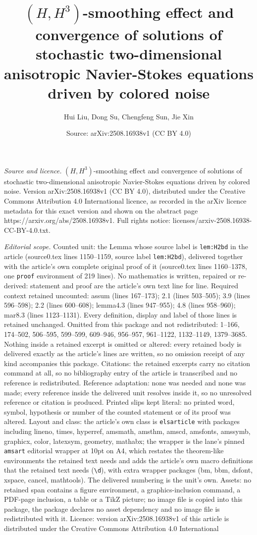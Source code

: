 \documentclass[10pt,a4paper]{amsart}
\title[$(H,H^3)$-smoothing effect and convergence of solutions of s]{$(H,H^3)$-smoothing effect and convergence of solutions of stochastic two-dimensional anisotropic Navier-Stokes equations driven by colored noise}
\author{Hui Liu, Dong Su, Chengfeng Sun, Jie Xin}
\date{Source: arXiv:2508.16938v1 (CC BY 4.0)}
\begin{document}
\maketitle

\noindent\emph{Source and licence.} $(H,H^3)$-smoothing effect and convergence of solutions of stochastic two-dimensional anisotropic Navier-Stokes equations driven by colored noise. Version arXiv:2508.16938v1 (CC BY 4.0), distributed under the Creative Commons Attribution 4.0 International licence, as recorded in the arXiv licence metadata for this exact version and shown on the abstract page https://arxiv.org/abs/2508.16938v1. Full rights notice: licenses/arxiv-2508.16938-CC-BY-4.0.txt.\par\smallskip

\noindent\textit{Editorial scope.} Counted unit: the Lemma whose source label is \texttt{lem:H2bd} in the article (source0.tex lines 1150--1159, source label \texttt{lem:H2bd}), delivered together with the article's own complete original proof of it (source0.tex lines 1160--1378, one \texttt{proof} environment of 219 lines). No mathematics is written, repaired or re-derived: statement and proof are the article's own text line for line. Required context retained uncounted: assum (lines 167--173); 2.1 (lines 503--505); 3.9 (lines 596--598); 2.2 (lines 600--608); lemma4.3 (lines 947--955); 4.8 (lines 958--960); mar8.3 (lines 1123--1131). Every definition, display and label of those lines is retained unchanged. Omitted from this package and not redistributed: 1--166, 174--502, 506--595, 599--599, 609--946, 956--957, 961--1122, 1132--1149, 1379--3685. Nothing inside a retained excerpt is omitted or altered: every retained body is delivered exactly as the article's lines are written, so no omission receipt of any kind accompanies this package. Citations: the retained excerpts carry no citation command at all, so no bibliography entry of the article is transcribed and no reference is redistributed. Reference adaptation: none was needed and none was made; every reference inside the delivered unit resolves inside it, so no unresolved reference or citation is produced. Printed slips kept literal: no printed word, symbol, hypothesis or number of the counted statement or of its proof was altered. Layout and class: the article's own class is \texttt{elsarticle} with packages including lineno, times, hyperref, amsmath, amsthm, amscd, amsfonts, amssymb, graphicx, color, latexsym, geometry, mathabx; the wrapper is the lane's pinned \texttt{amsart} editorial wrapper at 10pt on A4, which restates the theorem-like environments the retained text needs and adds the article's own macro definitions that the retained text needs (\texttt{\textbackslash d}), with extra wrapper packages (bm, bbm, dsfont, xspace, cancel, mathtools). The delivered numbering is the unit's own. Assets: no retained span contains a figure environment, a graphics-inclusion command, a PDF-page inclusion, a table or a TikZ picture; no image file is copied into this package, the package declares no asset dependency and no image file is redistributed with it. Licence: version arXiv:2508.16938v1 of this article is distributed under the Creative Commons Attribution 4.0 International 
\end{document}
